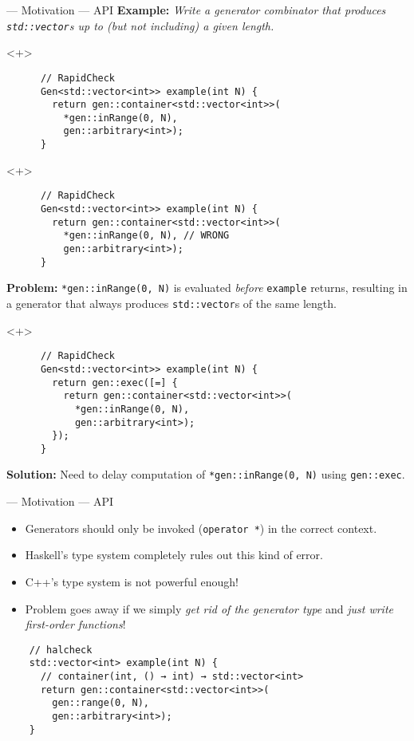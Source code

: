 \begin{frame}[fragile,t]{\halcheck{} --- Motivation --- API}
  \textbf{Example:} \emph{Write a generator combinator that produces \texttt{std::vector}s up to (but not including) a given length.}

  \begin{onlyenv}<+>
    \begin{verbatim}
      // RapidCheck
      Gen<std::vector<int>> example(int N) {
        return gen::container<std::vector<int>>(
          *gen::inRange(0, N),
          gen::arbitrary<int>);
      }
    \end{verbatim}
  \end{onlyenv}

  \begin{onlyenv}<+>
    \begin{verbatim}
      // RapidCheck
      Gen<std::vector<int>> example(int N) {
        return gen::container<std::vector<int>>(
          *gen::inRange(0, N), // WRONG
          gen::arbitrary<int>);
      }
    \end{verbatim}

    \textbf{Problem:} \texttt{*gen::inRange(0, N)} is evaluated \emph{before} \texttt{example} returns, resulting in a generator that always produces \texttt{std::vector}s of the same length.
  \end{onlyenv}

  \begin{onlyenv}<+>
    \begin{verbatim}
      // RapidCheck
      Gen<std::vector<int>> example(int N) {
        return gen::exec([=] {
          return gen::container<std::vector<int>>(
            *gen::inRange(0, N),
            gen::arbitrary<int>);
        });
      }
    \end{verbatim}

    \textbf{Solution:} Need to delay computation of \texttt{*gen::inRange(0, N)} using \texttt{gen::exec}.
  \end{onlyenv}
\end{frame}

\begin{frame}[fragile]{\halcheck{} --- Motivation --- API}
  \begin{itemize}
    \item Generators should only be invoked (\texttt{operator *}) in the correct context.
    \item Haskell's type system completely rules out this kind of error.
    \item C++'s type system is not powerful enough!
    \item Problem goes away if we simply \emph{get rid of the generator type} and \emph{just write first-order functions}!
  \end{itemize}

  \begin{verbatim}
    // halcheck
    std::vector<int> example(int N) {
      // container(int, () → int) → std::vector<int>
      return gen::container<std::vector<int>>(
        gen::range(0, N),
        gen::arbitrary<int>);
    }
  \end{verbatim}
\end{frame}

